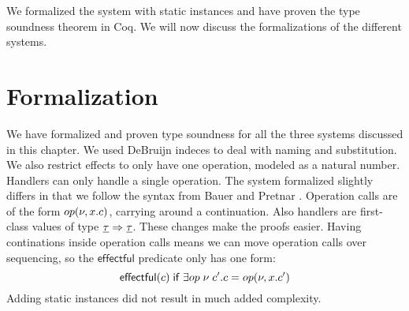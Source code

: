 {We formalized the system with static instances and have proven the type soundness theorem in Coq.
We will now discuss the formalizations of the different systems.

\section{Formalization}
\label{sec:formalization}

We have formalized and proven type soundness for all the three systems discussed in this chapter.
We used DeBruijn indeces to deal with naming and substitution.
We also restrict effects to only have one operation, modeled as a natural number.
Handlers can only handle a single operation.
The system formalized slightly differs in that we follow the syntax from Bauer and Pretnar \autocite{eff2}.
Operation calls are of the form $op(\nu, x. c)$, carrying around a continuation.
Also handlers are first-class values of type $\underline{\tau} \Rightarrow \underline{\tau}$.
These changes make the proofs easier.
Having continations inside operation calls means we can move operation calls over sequencing, so the $\mathsf{effectful}$ predicate only has one form:
\[ \mathsf{effectful}(c) \;\mathsf{if}\; \exists op \; \nu \; c'. c = op(\nu, x. c') \]
Adding static instances did not result in much added complexity.
}